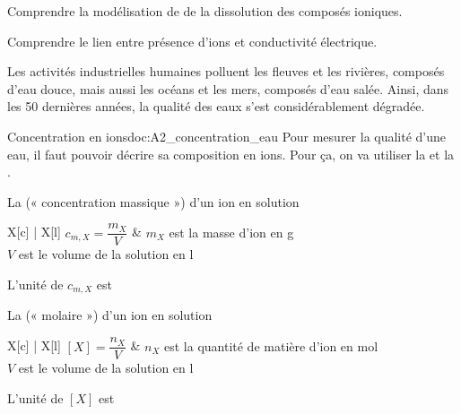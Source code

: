 \teteTermStssEnvi

\vspace*{-36pt}


\begin{objectifs}
  \item Comprendre la modélisation de de la dissolution des composés ioniques.
  \item Comprendre le lien entre présence d'ions et conductivité électrique.
\end{objectifs}

\begin{contexte}
  Les activités industrielles humaines polluent les fleuves et les rivières, composés d'eau douce, mais aussi les océans et les mers, composés d'eau salée.
  Ainsi, dans les 50 dernières années, la qualité des eaux s'est considérablement dégradée.
  
\end{contexte}


\begin{doc}{Concentration en ions}{doc:A2_concentration_eau}
  Pour mesurer la qualité d'une eau, il faut pouvoir décrire sa composition en ions.
  Pour ça, on va utiliser la 
  et la .

  \begin{importants}  
    La  (« concentration massique ») d'un ion en solution
    \begin{center}
      \begin{tblr}{X[c] | X[l]}
        $c_{m,X} = \dfrac{m_X}{V}$ &
        { $m_X$ est la masse d'ion en \unit{\g} \\
        $V$ est le volume de la solution en \unit{\litre} }
      \end{tblr}
    \end{center}
    L'unité de $c_{m,X}$ est \texteTrou[0.1]{\unit{\g\per\litre}}
  \end{importants}
  \begin{importants}  
    La  (« molaire ») d'un ion en solution
    \begin{center}
      \begin{tblr}{X[c] | X[l]}
        $[X] = \dfrac{n_X}{V}$ &
        { $n_X$ est la quantité de matière d'ion en \unit{\mole} \\
        $V$ est le volume de la solution en \unit{\litre} }
      \end{tblr}
    \end{center}
    L'unité de $[X]$ est \texteTrou[0.1]{\unit{\mole\per\litre}}
  \end{importants}
\end{doc}

